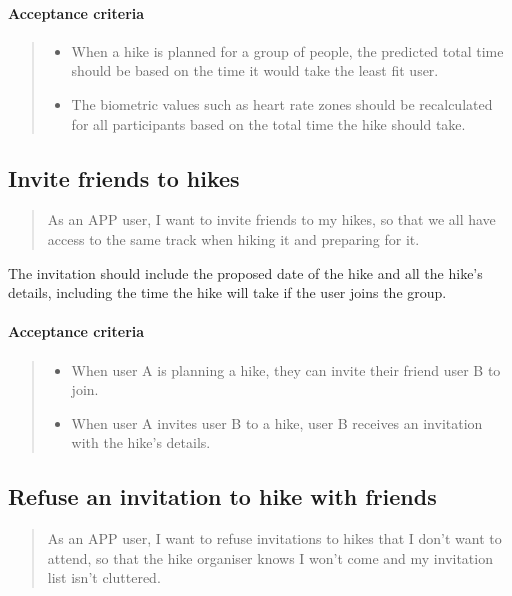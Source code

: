 \paragraph*{Acceptance criteria}
\begin{quote}
\begin{itemize}
    \item When a hike is planned for a group of people, the predicted total time should be based on the time it would take the least fit user.
    \item The biometric values such as heart rate zones should be recalculated for all participants based on the total time the hike should take.
\end{itemize}
\end{quote}


\subsection{Invite friends to hikes}\label{US:friends-invite}
\begin{quote}
As an APP user, I want to invite friends to my hikes, so that we all have access to the same track when hiking it and preparing for it.
\end{quote}

The invitation should include the proposed date of the hike and all the hike's details, including the time the hike will take if the user joins the group.

\paragraph*{Acceptance criteria}
\begin{quote}
\begin{itemize}
    \item When user A is planning a hike, they can invite their friend user B to join. 
    \item When user A invites user B to a hike, user B receives an invitation with the hike's details.
\end{itemize}
\end{quote}

\subsection{Refuse an invitation to hike with friends}\label{US:friends-invite-refuse}
\begin{quote}
As an APP user, I want to refuse invitations to hikes that I don't want to attend, so that the hike organiser knows I won't come and my invitation list isn't cluttered.
\end{quote}

